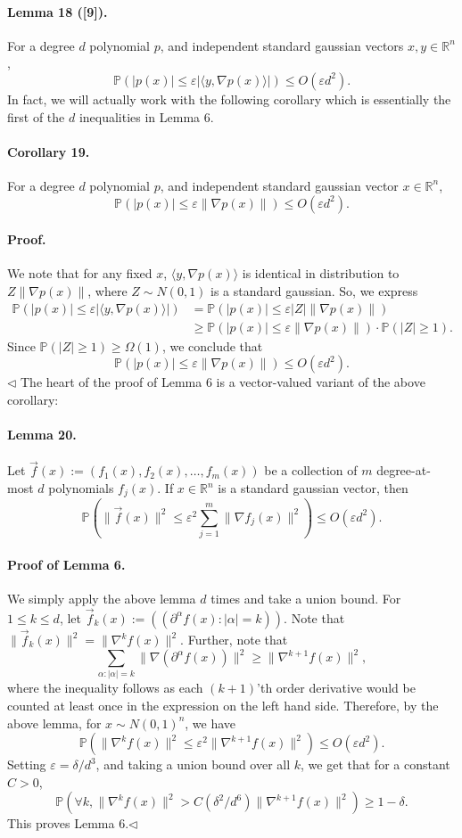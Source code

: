 \documentclass[10pt,a4paper]{article}
\begin{document}
\paragraph{Lemma 18 ([9]).} For a degree $d$ polynomial $p$, and independent standard gaussian vectors $x,y\in\mathbb R^n$,
\[\mathbb P(|p(x)|\leq\varepsilon|\langle y,\nabla p(x)\rangle|)\leq O(\varepsilon d^2).\]
In fact, we will actually work with the following corollary which is essentially the first of the $d$ inequalities in Lemma 6.
\paragraph{Corollary 19.} For a degree $d$ polynomial $p$, and independent standard gaussian vector $x\in\mathbb R^n$,
\[\mathbb P(|p(x)|\leq\varepsilon\|\nabla p(x)\|)\leq O(\varepsilon d^2).\]
\paragraph{Proof.} We note that for any fixed $x$, $\langle y,\nabla p(x)\rangle$ is identical in distribution to $Z\|\nabla p(x)\|$, where $Z\sim N(0,1)$ is a standard gaussian. So, we express
\begin{align*}
\mathbb P(|p(x)|\leq\varepsilon|\langle y,\nabla p(x)\rangle|)&=\mathbb P(|p(x)|\leq\varepsilon|Z|\|\nabla p(x)\|)\\
&\geq\mathbb P(|p(x)|\leq\varepsilon\|\nabla p(x)\|)\cdot\mathbb P(|Z|\geq1).
\end{align*}
Since $\mathbb P(|Z|\geq1)\geq\Omega(1)$, we conclude that
\[\mathbb P(|p(x)|\leq\varepsilon\|\nabla p(x)\|)\leq O(\varepsilon d^2).\]\hfill$\triangleleft$
The heart of the proof of Lemma 6 is a vector-valued variant of the above corollary:
\paragraph{Lemma 20.} Let $\vec f(x):=(f_1(x),f_2(x),\ldots,f_m(x))$ be a collection of $m$ degree-at-most $d$ polynomials $f_j(x)$. If $x\in\mathbb R^n$ is a standard gaussian vector, then
\[\mathbb P\left(\|\vec f(x)\|^2\leq\varepsilon^2\sum_{j=1}^m\|\nabla f_j(x)\|^2\right)\leq O(\varepsilon d^2).\]
\paragraph{Proof of Lemma 6.} We simply apply the above lemma $d$ times and take a union bound. For $1\leq k\leq d$, let $\vec f_k(x):=((\partial^\alpha f(x):|\alpha|=k))$. Note that $\|\vec f_k(x)\|^2=\|\nabla^kf(x)\|^2$. Further, note that
\[\sum_{\alpha:|\alpha|=k}\|\nabla(\partial^\alpha f(x))\|^2\geq\|\nabla^{k+1}f(x)\|^2,\]
where the inequality follows as each $(k+1)$'th order derivative would be counted at least once in the expression on the left hand side. Therefore, by the above lemma, for $x\sim N(0,1)^n$, we have
\[\mathbb P(\|\nabla^kf(x)\|^2\leq\varepsilon^2\|\nabla^{k+1}f(x)\|^2)\leq O(\varepsilon d^2).\]
Setting $\varepsilon=\delta/d^3$, and taking a union bound over all $k$, we get that for a constant $C>0$,
\[\mathbb P(\forall k,\|\nabla^kf(x)\|^2>C(\delta^2/d^6)\|\nabla^{k+1}f(x)\|^2)\geq1-\delta.\]
This proves Lemma 6.\hfill$\triangleleft$
\end{document}
